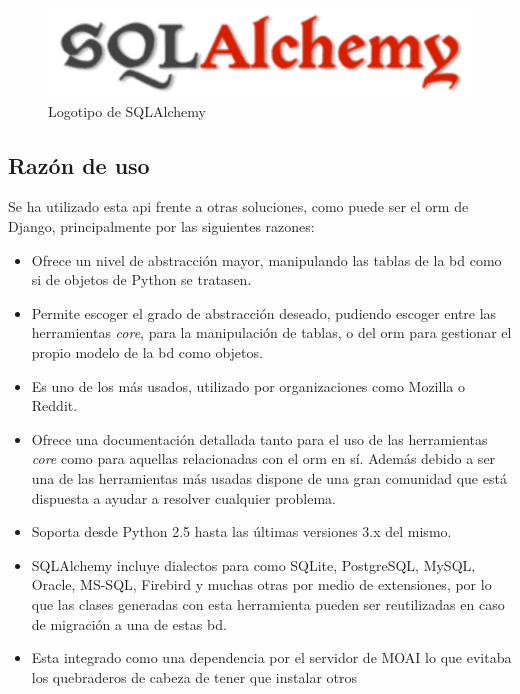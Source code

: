 \begin{figure}[!htbp]
	\centering
	\includegraphics[scale=0.5]{fig/sqla_logo}
	\caption{Logotipo de SQLAlchemy}
\end{figure}

\subsection{Razón de uso}

Se ha utilizado esta \acrshort{api} frente a otras soluciones, como puede ser el \acrshort{orm} de Django, principalmente por las siguientes razones:

\begin{itemize}
	\item Ofrece un nivel de abstracción mayor, manipulando las tablas de la \acrshort{bd} como si de objetos de Python se tratasen.
	\item Permite escoger el grado de abstracción deseado, pudiendo escoger entre las herramientas \textit{core}, para la manipulación de tablas, o del \acrshort{orm} para gestionar el propio modelo de la \acrshort{bd} como objetos.
	\item Es uno de los  más usados, utilizado por organizaciones como Mozilla\cite{Mozilla} o Reddit\cite{Reddit}.
	\item Ofrece una documentación detallada tanto para el uso de las herramientas \textit{core} como para aquellas relacionadas con el \acrshort{orm} en sí. Además debido a ser una de las herramientas más usadas dispone de una gran comunidad que está dispuesta a ayudar a resolver cualquier problema.
	\item Soporta desde Python 2.5 hasta las últimas versiones 3.x del mismo.
	\item SQLAlchemy incluye dialectos para  como SQLite, PostgreSQL, MySQL, Oracle\cite{Oracle}, MS-SQL\cite{MSSQL}, Firebird\cite{Firebird} y muchas otras por medio de extensiones, por lo que las clases generadas con esta herramienta pueden ser reutilizadas en caso de migración a una de estas \acrshort{bd}.
	\item Esta integrado como una dependencia por el servidor de MOAI lo que evitaba los quebraderos de cabeza de tener que instalar otros 
\end{itemize}

